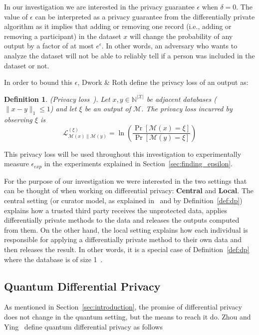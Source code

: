 \documentclass{ieeeaccess}
\newtheorem{definition}{Definition}[section]
\begin{document}
In our investigation we are interested in the privacy guarantee $\epsilon$ when $\delta = 0$. The value of $\epsilon$ can be interpreted as a privacy guarantee from the differentially private algorithm as it implies that adding or removing one record (i.e., adding or removing a participant) in the dataset $x$ will change the probability of any output by a factor of at most $e^{\epsilon}$. In other words, an adversary who wants to analyze the dataset will not be able to reliably tell if a person was included in the dataset or not.

In order to bound this $\epsilon$, Dwork \& Roth define the privacy loss of an output as:

\begin{definition}
    (Privacy loss~\cite[Sec.~2.3]{dwork2014algorithmic}). Let $x, y \in \mathbb{N}^{|\mathcal{X}|}$ be adjacent databases ($\|x - y\|_1 \leq 1$) and let $\xi$ be an output of $\mathcal{M}$. The privacy loss incurred by observing $\xi$ is
    \[
      \mathcal{L}^{(\xi)}_{\mathcal{M}(x) \| \mathcal{M}(y)} = \ln\left(\frac{\Pr[\mathcal{M}(x) = \xi]}{\Pr[\mathcal{M}(y) = \xi]}\right)
    \]
    \label{def:privacy_loss}
\end{definition}

This privacy loss will be used throughout this investigation to experimentally measure $\epsilon_{exp}$ in the experiments explained in Section~\ref{sec:finding_epsilon}.

For the purpose of our investigation we were interested in the two settings that can be thought of when working on differential privacy: \textbf{Central} and \textbf{Local}. The central setting (or curator model, as explained in~\cite{dwork2014algorithmic} and by Definition~\ref{def:dp}) explains how a trusted third party receives the unprotected data, applies differentially private methods to the data and releases the outputs computed from them. On the other hand, the local setting explains how each individual is responsible for applying a differentially private method to their own data and then releases the result. In other words, it is a special case of Definition~\ref{def:dp} where the database is of size 1~\cite[Def.~12.1]{dwork2014algorithmic}.


\subsection{Quantum Differential Privacy}

As mentioned in Section~\ref{sec:introduction}, the promise of differential privacy does not change in the quantum setting, but the means to reach it do. Zhou and Ying~\cite{zhou2017differential} define quantum differential privacy as follows
\end{document}
